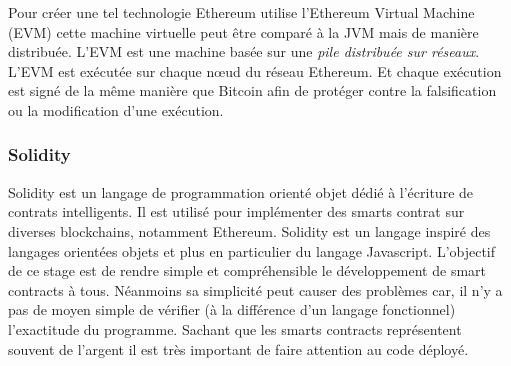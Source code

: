 Pour créer une tel technologie Ethereum utilise l'Ethereum Virtual Machine (EVM) cette machine virtuelle peut être comparé à la JVM mais de manière distribuée.
L'EVM est une machine basée sur une \emph{pile distribuée sur réseaux}.
L'EVM est exécutée sur chaque nœud du réseau Ethereum. Et chaque exécution est signé de la même manière que Bitcoin afin de protéger contre la falsification
ou la modification d'une exécution.

\subsubsection{Solidity}

Solidity est un langage de programmation orienté objet dédié à l'écriture de contrats intelligents. Il est utilisé pour implémenter des smarts contrat sur diverses 
blockchains, notamment Ethereum. Solidity est un langage inspiré des langages orientées objets et plus en particulier du langage Javascript. L'objectif de ce stage est de rendre simple et
compréhensible le développement de smart contracts à tous. Néanmoins sa simplicité peut causer des problèmes car, il n'y a pas de moyen simple de vérifier (à la différence d'un langage fonctionnel)
l'exactitude du programme.  Sachant que les smarts contracts représentent souvent de l'argent il est très important de faire attention au code déployé.
